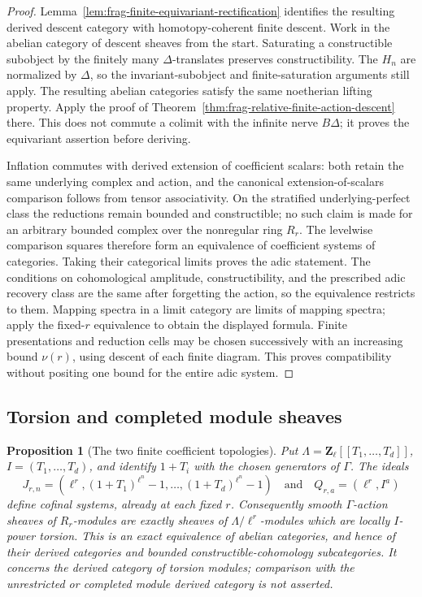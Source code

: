 \documentclass[11pt]{article}
\newtheorem{proposition}[theorem]{Proposition}
\theoremstyle{definition}
\theoremstyle{remark}
\begin{document}
\begin{proof}
Lemma~\ref{lem:frag-finite-equivariant-rectification} identifies the
resulting derived descent category with homotopy-coherent finite
descent.  Work in the abelian category of descent sheaves from the start.  Saturating a constructible subobject by the
finitely many $\Delta$-translates preserves constructibility.  The
$H_n$ are normalized by $\Delta$, so the invariant-subobject and
finite-saturation arguments still apply.  The resulting abelian
categories satisfy the same noetherian lifting property.  Apply the
proof of Theorem~\ref{thm:frag-relative-finite-action-descent} there.
This does not commute a colimit with the infinite nerve $B\Delta$;
it proves the equivariant assertion before deriving.

Inflation commutes with derived extension of coefficient scalars: both
retain the same underlying complex and action, and the canonical
extension-of-scalars comparison follows from tensor associativity.
On the stratified underlying-perfect class the reductions remain
bounded and constructible; no such claim is made for an arbitrary
bounded complex over the nonregular ring $R_r$.  The levelwise
comparison squares therefore form an equivalence of coefficient
systems of categories.  Taking their categorical limits proves the
adic statement.  The conditions on cohomological amplitude,
constructibility, and the prescribed adic recovery class are the
same after forgetting the action, so the equivalence restricts to them.
Mapping spectra in a limit category are limits of mapping spectra;
apply the fixed-$r$ equivalence to obtain the displayed formula.
Finite presentations and reduction cells may be chosen successively
with an increasing bound $\nu(r)$, using descent of each finite diagram.
This proves compatibility without positing one bound for the entire
adic system.
\end{proof}

\subsection{Torsion and completed module sheaves}

\begin{proposition}[The two finite coefficient topologies]
\label{prop:frag-iwasawa-ideal-cofinality}
Put $\Lambda=\mathbf Z_\ell[[T_1,\ldots,T_d]]$, $I=(T_1,\ldots,T_d)$,
and identify $1+T_i$ with the chosen generators of $\Gamma$.  The ideals
\[
 J_{r,n}=(\ell^r,(1+T_1)^{\ell^n}-1,\ldots,
                      (1+T_d)^{\ell^n}-1)
 \quad\text{and}\quad Q_{r,a}=(\ell^r,I^a)
\]
define cofinal systems, already at each fixed $r$.  Consequently smooth
$\Gamma$-action sheaves of $R_r$-modules are exactly sheaves of
$\Lambda/\ell^r$-modules which are locally $I$-power torsion.
This is an exact equivalence of abelian categories, and hence of their
derived categories and bounded constructible-cohomology subcategories.
It concerns the derived category of torsion modules; comparison with
the unrestricted or completed module derived category is not asserted.
\end{proposition}
\end{document}
